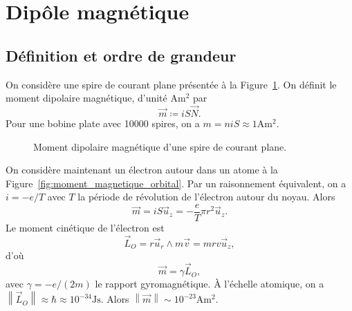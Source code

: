 \section{Dipôle magnétique}
\subsection{Définition et ordre de grandeur}

On considère une spire de courant plane présentée à la Figure~\ref{fig:moment_dipolaire_magnetique_spire_plane}. On définit le moment dipolaire magnétique, d'unité $\si{\ampere\metre\squared}$ par
\begin{equation}
    \boxed{
        \vec{m}\coloneqq iS\vec{N}.
    }
\end{equation}
Pour une bobine plate avec 10000 spires, on a $m=niS\approx1\si{\ampere\metre\squared}$.

\begin{figure}
    \centering
    \caption{Moment dipolaire magnétique d'une spire de courant plane.}
    \label{fig:moment_dipolaire_magnetique_spire_plane}
\end{figure}

On considère maintenant un électron autour dans un atome à la Figure~\ref{fig:moment_magnetique_orbital}. Par un raisonnement équivalent, on a $i=-e/T$ avec $T$ la période de révolution de l'électron autour du noyau. Alors 
\begin{equation}
    \vec{m}=iS\vec{u}_z=-\frac{e}{T}\pi r^{2}\vec{u}_z.
\end{equation}
Le moment cinétique de l'électron est 
\begin{equation}
    \vec{L}_O=r\vec{u}_r\wedge m\vec{v}=mrv\vec{u}_z,
\end{equation}
d'où
\begin{equation}
    \boxed{
        \vec{m}=\gamma\vec{L}_O,
    }
\end{equation}
avec $\gamma=-e/(2m)$ le rapport gyromagnétique. À l'échelle atomique, on a $\left\lVert\vec{L}_O\right\rVert\approx\hbar\approx10^{-34}\si{\joule\second}$. Alors $\left\lVert\vec{m}\right\rVert\sim10^{-23}\si{\ampere\metre\squared}$.

